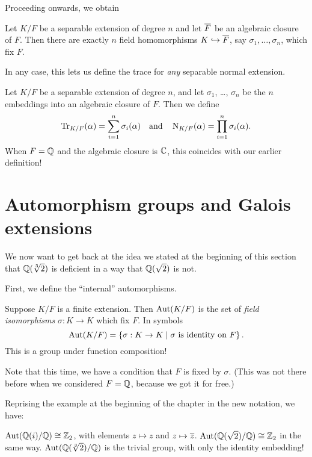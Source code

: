 Proceeding onwards, we obtain
\begin{theorem}
	Let $K/F$ be a separable extension of degree $n$ and let $\overline F$ be an algebraic closure of $F$.
	Then there are exactly $n$ field homomorphisms $K \hookrightarrow \overline F$,
	say $\sigma_1, \dots, \sigma_n$, which fix $F$.
\end{theorem}

In any case, this lets us define the trace for \emph{any} separable normal extension.
\begin{definition}
Let $K/F$ be a separable extension of degree $n$, and let $\sigma_1$, \dots, $\sigma_n$
be the $n$ embeddings into an algebraic closure of $F$. Then we define
\[
	\operatorname{Tr}_{K/F}(\alpha) = \sum_{i=1}^n \sigma_i(\alpha)
	\quad\text{and}\quad
	\operatorname{N}_{K/F}(\alpha) = \prod_{i=1}^n \sigma_i(\alpha).
\]
When $F = \mathbb Q$ and the algebraic closure is $\mathbb C$, this coincides with our earlier definition!
\end{definition}


\section{Automorphism groups and Galois extensions}
We now want to get back at the idea we stated at the beginning of
this section that $\mathbb Q(\sqrt[3]{2})$ is deficient in a way that $\mathbb Q(\sqrt 2)$ is not.

First, we define the ``internal'' automorphisms.
\begin{definition}
	Suppose $K/F$ is a finite extension.
	Then $\operatorname{Aut}(K/F)$ is the set of \emph{field isomorphisms} $\sigma : K \to K$ which fix $F$.
	In symbols
	\[ \operatorname{Aut}(K/F) =
		\left\{
		\sigma : K \to K \mid
		\text{$\sigma$ is identity on $F$}
	  \right\}.
	\]
	This is a group under function composition!
\end{definition}
Note that this time, we have a condition that $F$ is fixed by $\sigma$.
(This was not there before when we considered $F = \mathbb Q$, because we got it for free.)

\begin{example}
	Reprising the example at the beginning of the chapter in the new notation, we have:
	\begin{enumerate}[(a)]
		\ii $\operatorname{Aut}(\mathbb Q(i) / \mathbb Q) \cong \mathbb Z_{2}$, with elements $z \mapsto z$ and $z \mapsto \overline z$.
		\ii $\operatorname{Aut}(\mathbb Q(\sqrt 2) / \mathbb Q) \cong \mathbb Z_{2}$ in the same way.
		\ii $\operatorname{Aut}(\mathbb Q(\sqrt[3]{2}) / \mathbb Q)$ is the trivial group, with only the identity embedding!
	\end{enumerate}
\end{example}

